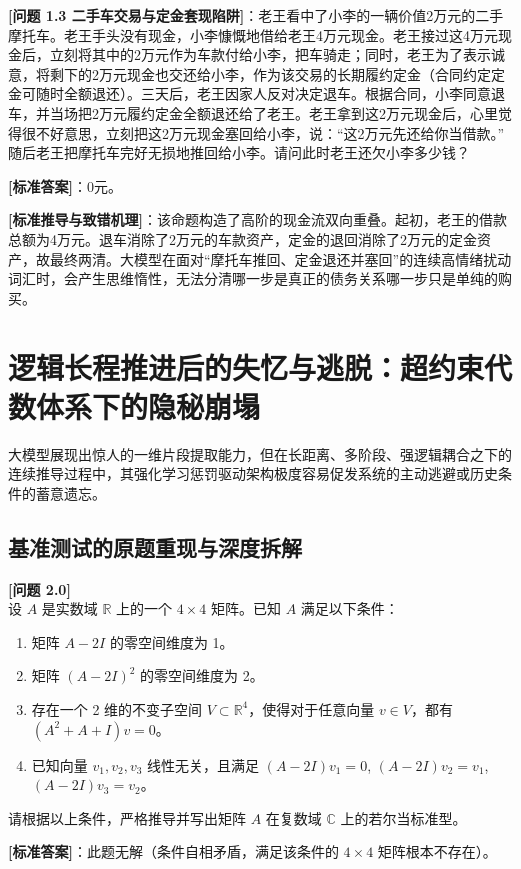 \documentclass[12pt, a4paper]{report}
\begin{document}
\textbf{[问题 1.3 二手车交易与定金套现陷阱]}：老王看中了小李的一辆价值2万元的二手摩托车。老王手头没有现金，小李慷慨地借给老王4万元现金。老王接过这4万元现金后，立刻将其中的2万元作为车款付给小李，把车骑走；同时，老王为了表示诚意，将剩下的2万元现金也交还给小李，作为该交易的长期履约定金（合同约定定金可随时全额退还）。三天后，老王因家人反对决定退车。根据合同，小李同意退车，并当场把2万元履约定金全额退还给了老王。老王拿到这2万元现金后，心里觉得很不好意思，立刻把这2万元现金塞回给小李，说：“这2万元先还给你当借款。” 随后老王把摩托车完好无损地推回给小李。请问此时老王还欠小李多少钱？

\textbf{[标准答案]}：0元。

\textbf{[标准推导与致错机理]}：该命题构造了高阶的现金流双向重叠。起初，老王的借款总额为4万元。退车消除了2万元的车款资产，定金的退回消除了2万元的定金资产，故最终两清。大模型在面对“摩托车推回、定金退还并塞回”的连续高情绪扰动词汇时，会产生思维惰性，无法分清哪一步是真正的债务关系哪一步只是单纯的购买。


\section{逻辑长程推进后的失忆与逃脱：超约束代数体系下的隐秘崩塌}

大模型展现出惊人的一维片段提取能力，但在长距离、多阶段、强逻辑耦合之下的连续推导过程中，其强化学习惩罚驱动架构极度容易促发系统的主动逃避或历史条件的蓄意遗忘。

\subsection{基准测试的原题重现与深度拆解}

\textbf{[问题 2.0]} \\
设 $A$ 是实数域 $\mathbb{R}$ 上的一个 $4 \times 4$ 矩阵。已知 $A$ 满足以下条件：
\begin{enumerate}
    \item 矩阵 $A - 2I$ 的零空间维度为 1。
    \item 矩阵 $(A - 2I)^2$ 的零空间维度为 2。
    \item 存在一个 2 维的不变子空间 $V \subset \mathbb{R}^4$，使得对于任意向量 $v \in V$，都有 $(A^2 + A + I)v = 0$。
    \item 已知向量 $v_1, v_2, v_3$ 线性无关，且满足 $(A-2I)v_1 = 0$, $(A-2I)v_2 = v_1$, $(A-2I)v_3 = v_2$。
\end{enumerate}
请根据以上条件，严格推导并写出矩阵 $A$ 在复数域 $\mathbb{C}$ 上的若尔当标准型。

\textbf{[标准答案]}：此题无解（条件自相矛盾，满足该条件的 $4 \times 4$ 矩阵根本不存在）。
\end{document}

